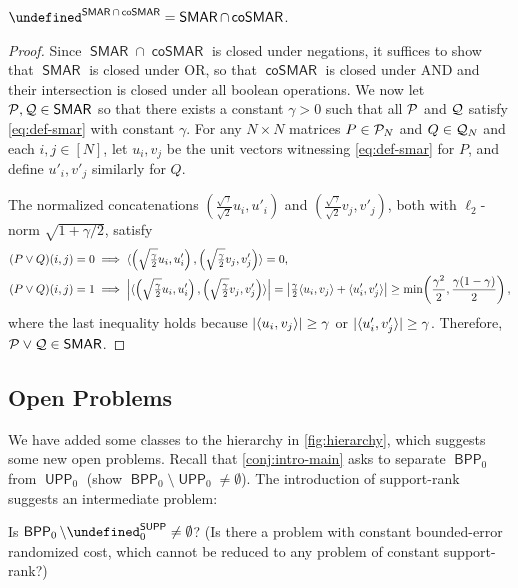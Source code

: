 \documentclass{article}
\newcommand{\cplxclass}[1]{\mathsf{#1}}
\let\P\undefined\DeclareMathOperator{\P}{\cplxclass{P}}
\DeclareMathOperator{\BPP}{\cplxclass{BPP}}
\DeclareMathOperator{\UPP}{\cplxclass{UPP}}
\DeclareMathOperator{\SUPP}{\cplxclass{SUPP}}
\DeclareMathOperator{\SMAR}{\cplxclass{SMAR}}
\DeclareMathOperator{\coSMAR}{\cplxclass{coSMAR}}
\begin{document}
\begin{boxproposition}
    $\P^{\SMAR \cap \coSMAR} = \SMAR \cap \coSMAR$.
\end{boxproposition}
\begin{proof}
Since $\SMAR \cap \coSMAR$ is closed under negations, it suffices to show that
$\SMAR$ is closed under OR, so that $\coSMAR$ is closed under AND and their
intersection is closed under all boolean operations. We now let $\cP, \cQ \in \SMAR$ so
that there exists a constant $\gamma > 0$ such that all $\mathcal{P}$ and $\mathcal{Q}$ satisfy
\cref{eq:def-smar} with constant $\gamma$. For any $N \times N$ matrices $P \in
\mathcal{P}_N$ and $Q \in \mathcal{Q}_N$ and each $i,j \in [N]$, let $u_i, v_j$ be the unit vectors
witnessing \cref{eq:def-smar} for $P$, and define $u'_i, v'_j$ similarly for $Q$.

The normalized concatenations $\left(\tfrac{\sqrt \gamma}{\sqrt 2} u_i, u'_i\right)$ and
$\left(\tfrac{\sqrt{\gamma}}{\sqrt 2}v_j, v'_j\right)$, both with $\ell_2$-norm $\sqrt{1 + \gamma/2}$, satisfy
\begin{align*}
    (P \vee Q)(i,j) = 0 &\implies \langle \left(\sqrt{\tfrac{\gamma}{2}} u_i, u'_i\right), \left( \sqrt{\tfrac{\gamma}{2}} v_j, v'_j\right)  \rangle = 0, \\
    (P \vee Q)(i,j) = 1 &\implies
    \left|\langle \left(\sqrt{\tfrac{\gamma}{2}} u_i, u'_i\right), \left( \sqrt{\tfrac{\gamma}{2}} v_j, v'_j\right)  \rangle\right| =
    \left| \tfrac{\gamma}{2} \langle u_i, v_j \rangle + \langle u'_i, v'_j \rangle \right| \geq \min\!\left( \frac{\gamma^2}{2}, \frac{\gamma(1-\gamma)}{2}\right),
\end{align*}
where the last inequality holds because $|\langle u_i, v_j \rangle| \geq \gamma$ or
$|\langle u'_i, v'_j \rangle| \geq \gamma$. Therefore, $\cP \vee \cQ \in \SMAR$.
\end{proof}


\subsection{Open Problems}\label{sec:open-problems}

We have added some classes to the hierarchy in \cref{fig:hierarchy}, which
suggests some new open problems. Recall that \cref{conj:intro-main} asks to
separate $\BPP_0$ from $\UPP_0$ (\ie show $\BPP_0 \setminus \UPP_0 \neq
\emptyset$). The introduction of support-rank suggests an intermediate problem:

\begin{question}
    Is $\BPP_0 \setminus \P_0^{\SUPP} \neq \emptyset$? (Is there a problem with
    constant bounded-error randomized cost, which cannot be reduced to any
    problem of constant support-rank?)
\end{question}
\end{document}
